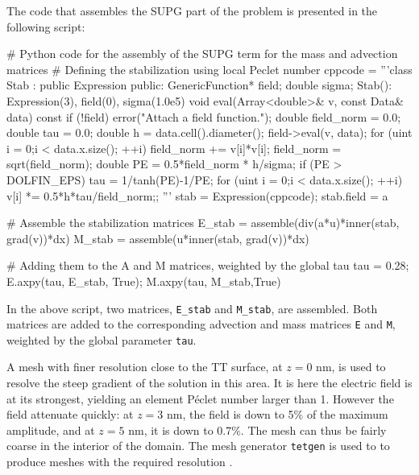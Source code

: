 The \pydolfin code that assembles the SUPG part of the problem is
presented in the following script:
\begin{python}
# Python code for the assembly of the SUPG term for the mass and advection matrices
# Defining the stabilization using local Peclet number
cppcode = '''class Stab : public Expression {
public:
  GenericFunction* field; double sigma;
  Stab(): Expression(3), field(0), sigma(1.0e5){}
  void eval(Array<double>& v, const Data& data) const {
    if (!field)
      error("Attach a field function.");
    double field_norm = 0.0; double tau = 0.0;
    double h = data.cell().diameter();
    field->eval(v, data);
    for (uint i = 0;i < data.x.size(); ++i)
      field_norm += v[i]*v[i];
    field_norm = sqrt(field_norm);
    double PE = 0.5*field_norm * h/sigma;
    if (PE > DOLFIN_EPS)
      tau = 1/tanh(PE)-1/PE;
    for (uint i = 0;i < data.x.size(); ++i)
      v[i] *= 0.5*h*tau/field_norm;}};
'''
stab = Expression(cppcode); stab.field = a

# Assemble the stabilization matrices
E_stab = assemble(div(a*u)*inner(stab, grad(v))*dx)
M_stab = assemble(u*inner(stab, grad(v))*dx)

# Adding them to the A and M matrices, weighted by the global tau
tau = 0.28; E.axpy(tau, E_stab, True); M.axpy(tau, M_stab,True)
\end{python}
In the above script, two matrices, \texttt{E\_stab} and
\texttt{M\_stab}, are assembled. Both matrices are added to the
corresponding advection and mass matrices \texttt{E} and \texttt{M},
weighted by the global parameter \texttt{tau}.

A mesh with finer resolution close to the TT surface, at $z=0$ nm, is
used to resolve the steep gradient of the solution in this area. It is
here the electric field is at its strongest, yielding an element
P\'eclet number larger than 1. However the field attenuate quickly: at
$z=3$ nm, the field is down to 5\% of the maximum amplitude, and at
$z=5$ nm, it is down to 0.7\%. The mesh can thus be fairly coarse in
the interior of the domain. The mesh generator \texttt{tetgen} is used
to to produce meshes with the required resolution \citep{Si2007}.


